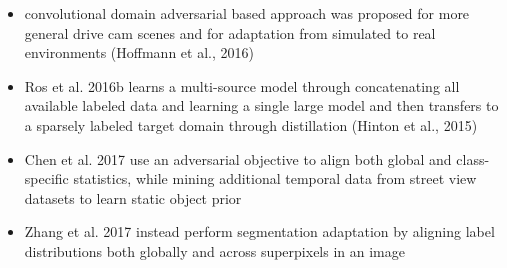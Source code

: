 \begin{itemize}
	\item convolutional domain adversarial based approach was proposed for more general drive cam scenes and for adaptation from simulated to real environments (Hoffmann et al., 2016)
	\item Ros et al. 2016b learns a multi-source model through concatenating all available labeled data and learning a single large model and then transfers to a sparsely labeled target domain through distillation (Hinton et al., 2015)
	\item Chen et al. 2017 use an adversarial objective to align both global and class-specific statistics, while mining additional temporal data from street view datasets to learn static object prior
	\item Zhang et al. 2017 instead perform segmentation adaptation by aligning label distributions both globally and across superpixels in an image
\end{itemize}

